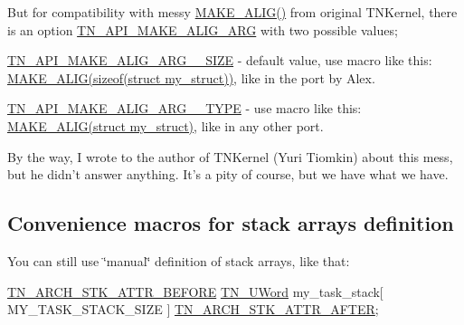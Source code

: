 But for compatibility with messy {\ttfamily \hyperlink{tn__oldsymbols_8h_aa42d2e6b5b7ff37bd485803fa2cb70a8}{M\+A\+K\+E\+\_\+\+A\+L\+I\+G()}} from original T\+N\+Kernel, there is an option {\ttfamily \hyperlink{tn__cfg__default_8h_a2a1148efc6a74131cc83ee50cbc386cd}{T\+N\+\_\+\+A\+P\+I\+\_\+\+M\+A\+K\+E\+\_\+\+A\+L\+I\+G\+\_\+\+A\+R\+G}} with two possible values;


\begin{DoxyItemize}
\item {\ttfamily \hyperlink{tn__cfg__dispatch_8h_a4972bf0cbc72e51a7463cf7d786d2b64}{T\+N\+\_\+\+A\+P\+I\+\_\+\+M\+A\+K\+E\+\_\+\+A\+L\+I\+G\+\_\+\+A\+R\+G\+\_\+\+\_\+\+S\+I\+Z\+E}} -\/ default value, use macro like this\+: {\ttfamily \hyperlink{tn__oldsymbols_8h_aa42d2e6b5b7ff37bd485803fa2cb70a8}{M\+A\+K\+E\+\_\+\+A\+L\+I\+G(sizeof(struct my\+\_\+struct))}}, like in the port by Alex.
\item {\ttfamily \hyperlink{tn__cfg__dispatch_8h_a04321413cf21754a05682b298df0493d}{T\+N\+\_\+\+A\+P\+I\+\_\+\+M\+A\+K\+E\+\_\+\+A\+L\+I\+G\+\_\+\+A\+R\+G\+\_\+\+\_\+\+T\+Y\+P\+E}} -\/ use macro like this\+: {\ttfamily \hyperlink{tn__oldsymbols_8h_aa42d2e6b5b7ff37bd485803fa2cb70a8}{M\+A\+K\+E\+\_\+\+A\+L\+I\+G(struct my\+\_\+struct)}}, like in any other port.
\end{DoxyItemize}

By the way, I wrote to the author of T\+N\+Kernel (Yuri Tiomkin) about this mess, but he didn't answer anything. It's a pity of course, but we have what we have.\hypertarget{tnkernel_diff_tnkernel_new_api__convenience_macros_stack}{}\subsection{Convenience macros for stack arrays definition}\label{tnkernel_diff_tnkernel_new_api__convenience_macros_stack}
You can still use \char`\"{}manual\char`\"{} definition of stack arrays, like that\+:


\begin{DoxyCode}
\hyperlink{tn__arch__example_8h_ae245dddb19cd7c12b7038a62d576fafa}{TN\_ARCH\_STK\_ATTR\_BEFORE}
\hyperlink{tn__arch__example_8h_ab80cba0fe9ffcd9011d53dfeb9e39bf4}{TN\_UWord} my\_task\_stack[ MY\_TASK\_STACK\_SIZE ]
\hyperlink{tn__arch__example_8h_ab082613959b539182b8b47bc87d18d6a}{TN\_ARCH\_STK\_ATTR\_AFTER};
\end{DoxyCode}


